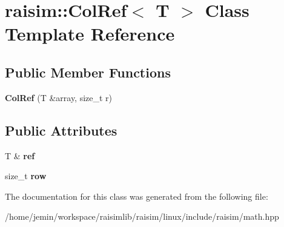 \hypertarget{classraisim_1_1ColRef}{}\section{raisim\+:\+:Col\+Ref$<$ T $>$ Class Template Reference}
\label{classraisim_1_1ColRef}
\subsection*{Public Member Functions}
\begin{DoxyCompactItemize}
\item 
\mbox{\label{classraisim_1_1ColRef_ac473dfc950132681653060de88b94092}} 
{\bfseries Col\+Ref} (T \&array, size\+\_\+t r)
\end{DoxyCompactItemize}
\subsection*{Public Attributes}
\begin{DoxyCompactItemize}
\item 
\mbox{\label{classraisim_1_1ColRef_a31081f12cca93d76cf3b89d3fe1ef79e}} 
T \& {\bfseries ref}
\item 
\mbox{\label{classraisim_1_1ColRef_a94a6efe1301df1cb121dd45e75e1709a}} 
size\+\_\+t {\bfseries row}
\end{DoxyCompactItemize}


The documentation for this class was generated from the following file\+:\begin{DoxyCompactItemize}
\item 
/home/jemin/workspace/raisimlib/raisim/linux/include/raisim/math.\+hpp\end{DoxyCompactItemize}

